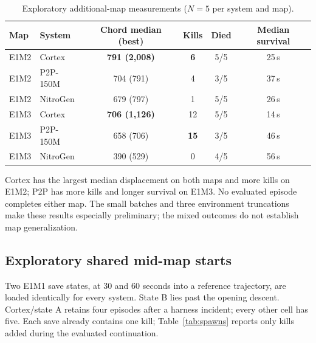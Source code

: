 \documentclass[11pt]{article}
\begin{document}
\begin{table}[ht]
\centering
\small
\begin{tabular}{llcccc}
\toprule
Map & System & Chord median (best) & Kills & Died & Median survival \\
\midrule
E1M2 & Cortex & \textbf{791 (2{,}008)} & \textbf{6} & 5/5 & 25\,s \\
E1M2 & P2P-150M & 704 (791) & 4 & 3/5 & 37\,s \\
E1M2 & NitroGen & 679 (797) & 1 & 5/5 & 26\,s \\
\midrule
E1M3 & Cortex & \textbf{706 (1{,}126)} & 12 & 5/5 & 14\,s \\
E1M3 & P2P-150M & 658 (706) & \textbf{15} & 3/5 & 46\,s \\
E1M3 & NitroGen & 390 (529) & 0 & 4/5 & 56\,s \\
\bottomrule
\end{tabular}
\caption{Exploratory additional-map measurements ($N{=}5$ per system and map).}
\label{tab:maps}
\end{table}

Cortex has the largest median displacement on both maps and more kills on E1M2; P2P has more kills and longer survival on E1M3. No evaluated episode completes either map. The small batches and three environment truncations make these results especially preliminary; the mixed outcomes do not establish map generalization.

\subsection{Exploratory shared mid-map starts}\label{sec:spawns}

Two E1M1 save states, at 30 and 60 seconds into a reference trajectory, are loaded identically for every system. State B lies past the opening descent. Cortex/state A retains four episodes after a harness incident; every other cell has five. Each save already contains one kill; Table~\ref{tab:spawns} reports only kills added during the evaluated continuation.
\end{document}
